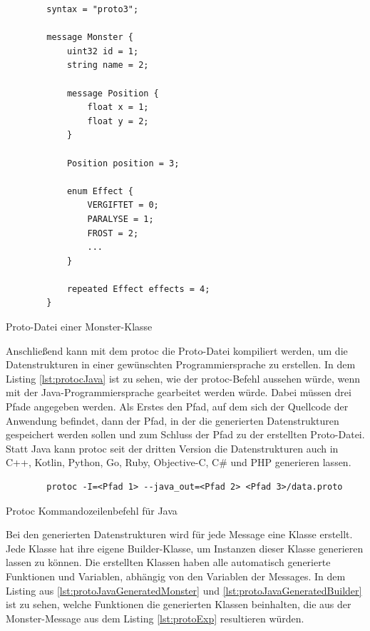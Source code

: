 \begin{listing}[htp]
    \begin{verbatim} 
        syntax = "proto3";
        
        message Monster {
            uint32 id = 1;
            string name = 2;

            message Position {
                float x = 1;
                float y = 2;
            }

            Position position = 3;

            enum Effect {
                VERGIFTET = 0;
                PARALYSE = 1;
                FROST = 2;
                ...
            }

            repeated Effect effects = 4;
        }
    \end{verbatim}
    \caption{Proto-Datei einer Monster-Klasse}
    \label{lst:protoExp}
\end{listing}

Anschließend kann mit dem \ac{protoc} die Proto-Datei kompiliert werden, um die Datenstrukturen in einer gewünschten Programmiersprache zu erstellen. In dem Listing \ref{lst:protocJava} ist zu sehen, wie der \ac{protoc}-Befehl aussehen würde, wenn mit der Java-Programmiersprache gearbeitet werden würde. Dabei müssen drei Pfade angegeben werden. Als Erstes den Pfad, auf dem sich der Quellcode der Anwendung befindet, dann der Pfad, in der die generierten Datenstrukturen gespeichert werden sollen und zum Schluss der Pfad zu der erstellten Proto-Datei. Statt Java kann \ac{protoc} seit der dritten Version die Datenstrukturen auch in C++, Kotlin, Python, Go, Ruby, Objective-C, C\# und PHP generieren lassen.\cite{protobufLanguageGuide}\cite{protobufProtocolBufferJava}

\begin{listing}[htp]
    \begin{verbatim} 
        protoc -I=<Pfad 1> --java_out=<Pfad 2> <Pfad 3>/data.proto
    \end{verbatim}
    \caption{Protoc Kommandozeilenbefehl für Java \cite{protobufProtocolBufferJava}}
    \label{lst:protocJava}
\end{listing}

Bei den generierten Datenstrukturen wird für jede Message eine Klasse erstellt. Jede Klasse hat ihre eigene Builder-Klasse, um Instanzen dieser Klasse generieren lassen zu können. Die erstellten Klassen haben alle automatisch generierte Funktionen und Variablen, abhängig von den Variablen der Messages. In dem Listing aus \ref{lst:protoJavaGeneratedMonster} und \ref{lst:protoJavaGeneratedBuilder} ist zu sehen, welche Funktionen die generierten Klassen beinhalten, die aus der Monster-Message aus dem Listing \ref{lst:protoExp} resultieren würden. 

